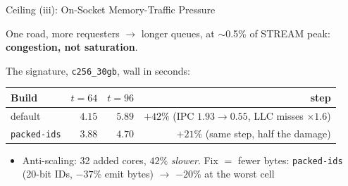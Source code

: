 \documentclass[aspectratio=169,10pt]{beamer}
\newcommand{\good}[1]{\textcolor{green!50!black}{#1}}
\newcommand{\bad}[1]{\textcolor{red!70!black}{#1}}
\begin{document}
\begin{frame}{Ceiling (iii): On-Socket Memory-Traffic Pressure}
  \begin{center}
  \end{center}
  One road, more requesters $\to$ longer queues, at $\sim$0.5\% of STREAM peak: \textbf{congestion, not saturation}.
  \smallskip

  {\footnotesize The signature, \texttt{c256\_30gb}, wall in seconds:}
  \begin{center}
    \small
    \begin{tabular}{lrrr}
      \toprule
      Build & $t{=}64$ & $t{=}96$ & step \\
      \midrule
      default & $4.15$ & $5.89$ & \bad{$+42\%$} \quad (IPC $1.93 \to 0.55$, LLC misses $\times 1.6$) \\
      \texttt{packed-ids} & $3.88$ & $4.70$ & \bad{$+21\%$} \quad (same step, half the damage) \\
      \bottomrule
    \end{tabular}
  \end{center}
  \begin{itemize}
    \item Anti-scaling: 32 added cores, $42\%$ \emph{slower}. Fix $=$ fewer bytes: \texttt{packed-ids} (20-bit IDs, $-37\%$ emit bytes) $\to$ \good{$-20\%$} at the worst cell
  \end{itemize}
\end{frame}
\end{document}
